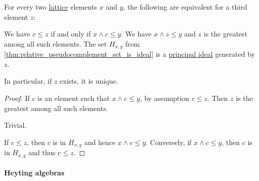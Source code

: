\begin{proposition}\label{thm:relative_pseudocomplement_set}
  For every two \hyperref[def:lattice]{lattice} elements \( x \) and \( y \), the following are equivalent for a third element \( z \):
  \begin{thmenum}
     We have \( c \leq z \) if and only if \( x \wedge c \leq y \).
     We have \( x \wedge z \leq y \) and \( z \) is the greatest among all such elements.
     The set \( H_{x,y} \) from \cref{thm:relative_pseudocomplement_set_is_ideal} is a \hyperref[def:lattice_ideal/principal]{principal ideal} generated by \( z \).
  \end{thmenum}
\end{proposition}
\begin{comments}
  \item In particular, if \( z \) exists, it is unique.
\end{comments}
\begin{proof}
   If \( c \) is an element such that \( x \wedge c \leq y \), by assumption \( c \leq z \). Then \( z \) is the greatest among all such elements.

   Trivial.

   If \( c \leq z \), then \( c \) is in \( H_{x,y} \) and hence \( x \wedge c \leq y \). Conversely, if \( x \wedge c \leq y \), then \( c \) is in \( H_{x,y} \) and thus \( c \leq z \).
\end{proof}

\paragraph{Heyting algebras}

